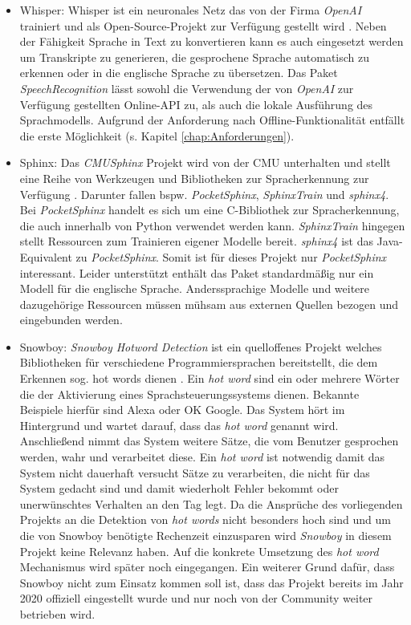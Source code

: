 \begin{itemize}
    \item Whisper: Whisper ist ein neuronales Netz das von der Firma \textit{OpenAI} trainiert und als Open-Source-Projekt zur Verfügung gestellt wird \cite{openai,whisper}. Neben der Fähigkeit Sprache in Text zu konvertieren kann es auch eingesetzt werden um Transkripte zu generieren, die gesprochene Sprache automatisch zu erkennen oder in die englische Sprache zu übersetzen. Das Paket \textit{SpeechRecognition} lässt sowohl die Verwendung der von \textit{OpenAI} zur Verfügung gestellten Online-\ac{API} zu, als auch die lokale Ausführung des Sprachmodells. Aufgrund der Anforderung nach Offline-Funktionalität entfällt die erste Möglichkeit (s. Kapitel \ref{chap:Anforderungen}).
    \item Sphinx: Das \textit{CMUSphinx} Projekt wird von der \ac{CMU} unterhalten und stellt eine Reihe von Werkzeugen und Bibliotheken zur Spracherkennung zur Verfügung \cite{sphinx_about}. Darunter fallen bspw. \textit{PocketSphinx}, \textit{SphinxTrain} und \textit{sphinx4}. Bei \textit{PocketSphinx} handelt es sich um eine C-Bibliothek zur Spracherkennung, die auch innerhalb von Python verwendet werden kann. \textit{SphinxTrain} hingegen stellt Ressourcen zum Trainieren eigener Modelle bereit. \textit{sphinx4} ist das Java-Equivalent zu \textit{PocketSphinx}. Somit ist für dieses Projekt nur \textit{PocketSphinx} interessant. Leider unterstützt enthält das Paket standardmäßig nur ein Modell für die englische Sprache. Anderssprachige Modelle und weitere dazugehörige Ressourcen müssen mühsam aus externen Quellen bezogen und eingebunden werden.
    \item Snowboy: \textit{Snowboy Hotword Detection} ist ein quelloffenes Projekt welches Bibliotheken für verschiedene Programmiersprachen bereitstellt, die dem Erkennen sog. \glqq{}hot words\grqq{} dienen \cite{snowboy}. Ein \textit{hot word} sind ein oder mehrere Wörter die der Aktivierung eines Sprachsteuerungssystems dienen. Bekannte Beispiele hierfür sind \glqq{}Alexa\grqq{} oder \glqq{}OK Google\grqq{}. Das System \glqq{}hört\grqq{} im Hintergrund und wartet darauf, dass das \textit{hot word} genannt wird. Anschließend nimmt das System weitere Sätze, die vom Benutzer gesprochen werden, wahr und verarbeitet diese. Ein \textit{hot word} ist notwendig damit das System nicht dauerhaft versucht Sätze zu verarbeiten, die nicht für das System gedacht sind und damit wiederholt Fehler bekommt oder unerwünschtes Verhalten an den Tag legt. Da die Ansprüche des vorliegenden Projekts an die Detektion von \textit{hot words} nicht besonders hoch sind und um die von Snowboy benötigte Rechenzeit einzusparen wird \textit{Snowboy} in diesem Projekt keine Relevanz haben. Auf die konkrete Umsetzung des \textit{hot word} Mechanismus wird später noch eingegangen. Ein weiterer Grund dafür, dass Snowboy nicht zum Einsatz kommen soll ist, dass das Projekt bereits im Jahr 2020 offiziell eingestellt wurde und nur noch von der Community weiter betrieben wird. 

\end{itemize}
